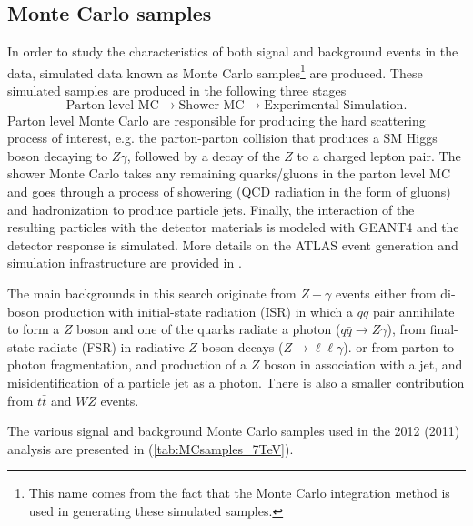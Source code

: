\subsection{Monte Carlo samples}
\label{subsec:mc}
In order to study the characteristics of both signal and background events 
in the data, simulated data known as Monte Carlo samples\footnote{This name
comes from the fact that the Monte Carlo integration method is used in generating
these simulated samples.} are produced. These simulated samples are produced
in the following three stages
\[
    \text{Parton level MC} \rightarrow \text{Shower MC} 
    \rightarrow \text{Experimental Simulation}.
\]
Parton level Monte Carlo are responsible for producing the hard scattering process
of interest, e.g. the parton-parton collision that produces a SM 
Higgs boson decaying to $Z\gamma$, followed by a decay of the $Z$ to 
a charged lepton pair. The shower Monte Carlo takes
any remaining quarks/gluons in the parton level MC and goes 
through a process of showering (QCD radiation in the form of gluons) and
hadronization to produce particle jets. Finally, the interaction of the resulting
particles with the detector materials is modeled with GEANT4 \cite{geant} and
the detector response is simulated. More details on the ATLAS event generation and
simulation infrastructure are provided in \cite{ATLASsimulation}.

The main backgrounds in this search originate from $Z+\gamma$ events either
from di-boson production with initial-state radiation (ISR)
in which a $q\bar q$ pair annihilate to form a $Z$ boson and one of the 
quarks radiate a photon ($q\bar q \to Z\gamma$), 
from final-state-radiate (FSR) in radiative $Z$ boson decays 
($Z \to \ell\ell\gamma$). or from parton-to-photon fragmentation, and production
of a $Z$ boson in association with a jet, and misidentification of a particle
jet as a photon. There is also a smaller contribution from  $t\bar t$ and $WZ$
events.

The various signal and background Monte Carlo samples used in the 2012 (2011) 
analysis are presented in  (\ref{tab:MCsamples_7TeV}).

